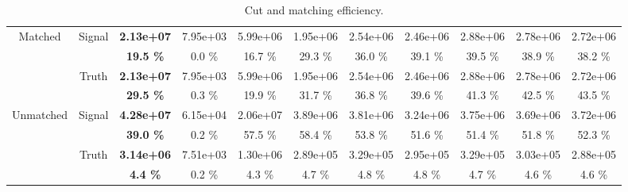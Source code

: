 \begin{landscape}
\begin{table}
\begin{tabular}{|c|c|>{\bfseries}c|c|c|c|c|c|c|c|c|}
    \hline                                                              
    \multirow{4}{*}{Matched}        & \multirow{2}{*}{Signal}   & 2.13e+07 & 7.95e+03 & 5.99e+06 & 1.95e+06 & 2.54e+06 & 2.46e+06 & 2.88e+06 & 2.78e+06 & 2.72e+06 \\
                                    &                           & 19.5 \%  & 0.0 \%   & 16.7 \%  & 29.3 \%  & 36.0 \%  & 39.1 \%  & 39.5 \%  & 38.9 \%  & 38.2 \%  \\
    \cline{2-11}                                                                                    
                                    & \multirow{2}{*}{Truth}    & 2.13e+07 & 7.95e+03 & 5.99e+06 & 1.95e+06 & 2.54e+06 & 2.46e+06 & 2.88e+06 & 2.78e+06 & 2.72e+06 \\
                                    &                           & 29.5 \%  & 0.3 \%   & 19.9 \%  & 31.7 \%  & 36.8 \%  & 39.6 \%  & 41.3 \%  & 42.5 \%  & 43.5 \%  \\
    \hline                                                              
    \hline                                                              
    \multirow{4}{*}{Unmatched}      & \multirow{2}{*}{Signal}   & 4.28e+07 & 6.15e+04 & 2.06e+07 & 3.89e+06 & 3.81e+06 & 3.24e+06 & 3.75e+06 & 3.69e+06 & 3.72e+06 \\
                                    &                           & 39.0 \%  & 0.2 \%   & 57.5 \%  & 58.4 \%  & 53.8 \%  & 51.6 \%  & 51.4 \%  & 51.8 \%  & 52.3 \%  \\
    \cline{2-11}                                                                                    
                                    & \multirow{2}{*}{Truth}    & 3.14e+06 & 7.51e+03 & 1.30e+06 & 2.89e+05 & 3.29e+05 & 2.95e+05 & 3.29e+05 & 3.03e+05 & 2.88e+05 \\
                                    &                           & 4.4 \%   & 0.2 \%   & 4.3 \%   & 4.7 \%   & 4.8 \%   & 4.8 \%   & 4.7 \%   & 4.6 \%   & 4.6 \%   \\
    \hline
  \end{tabular}
  \caption{Cut and matching efficiency.}
  \label{tab:CutAndMatchingEfficiency}
\end{table} 
\end{landscape}
